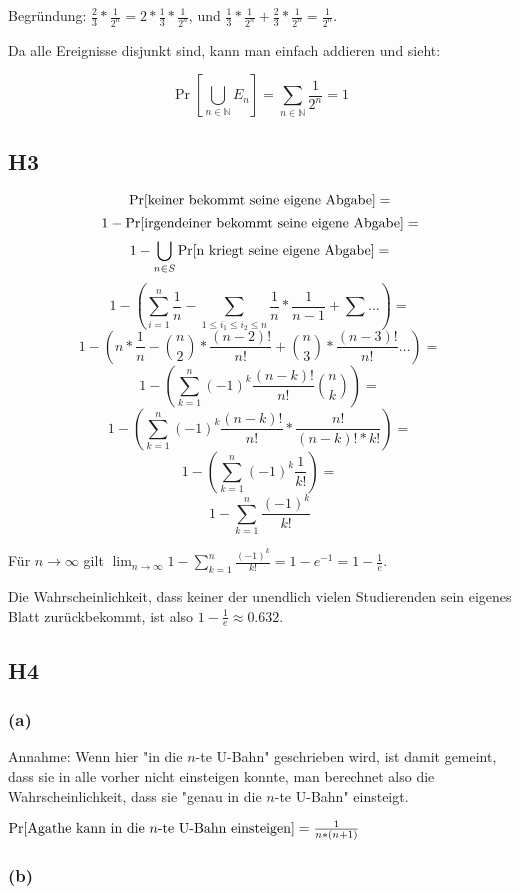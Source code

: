 \documentclass{article}
\begin{document}
Begründung: $\frac{2}{3}*\frac{1}{2^n}=2*\frac{1}{3}*\frac{1}{2^n}$,
und $\frac{1}{3}*\frac{1}{2^n}+\frac{2}{3}*\frac{1}{2^n}=\frac{1}{2^n}$.

Da alle Ereignisse disjunkt sind, kann man einfach addieren und sieht:

$$ \Pr[\bigcup_{n \in \mathbb{N}} E_n] = \sum_{n \in \mathbb{N}} \frac{1}{2^n}=1 $$

\subsection*{H3}

$$ \Pr[\hbox{keiner bekommt seine eigene Abgabe}]= $$
$$ 1-\Pr[\hbox{irgendeiner bekommt seine eigene Abgabe}]= $$
$$ 1-\bigcup_{n \in S} \Pr[\hbox{n kriegt seine eigene Abgabe}]= $$
$$ 1-(\sum_{i=1}^n \frac{1}{n}-\sum_{1 \le i_1 \le i_2 \le n} \frac{1}{n} * \frac{1}{n-1} + \sum \dots)= $$
$$ 1-(n*\frac{1}{n}-{n \choose 2}*\frac{(n-2)!}{n!}+{n \choose 3}*\frac{(n-3)!}{n!} \dots)= $$
$$ 1-(\sum_{k=1}^{n} (-1)^k \frac{(n-k)!}{n!} {n \choose k})= $$
$$ 1-(\sum_{k=1}^{n} (-1)^k \frac{(n-k)!}{n!} * \frac{n!}{(n-k)!*k!})= $$
$$ 1-(\sum_{k=1}^{n} (-1)^k \frac{1}{k!})= $$
$$ 1-\sum_{k=1}^{n} \frac{(-1)^k}{k!} $$

Für $n \rightarrow \infty$ gilt $\lim_{n \rightarrow \infty}
1-\sum_{k=1}^{n} \frac{(-1)^k}{k!}=1-e^{-1}=1-\frac{1}{e} $.

Die Wahrscheinlichkeit, dass keiner der unendlich vielen Studierenden
sein eigenes Blatt zurückbekommt, ist also $1-\frac{1}{e}\approx0.632$.

\subsection*{H4}

\subsubsection*{(a)}

Annahme: Wenn hier "in die $n$-te U-Bahn" geschrieben wird, ist damit
gemeint, dass sie in alle vorher nicht einsteigen konnte, man berechnet
also die Wahrscheinlichkeit, dass sie "genau in die $n$-te U-Bahn"
einsteigt.


$ \Pr[\hbox{Agathe kann in die $n$-te U-Bahn einsteigen}]=\frac{1}{n*(n+1)} $

\subsubsection*{(b)}
\end{document}

